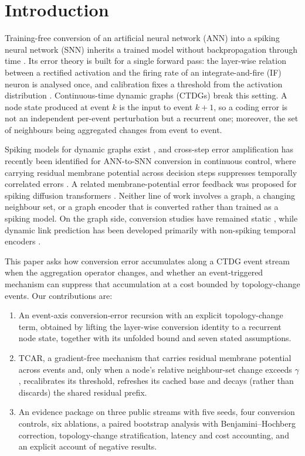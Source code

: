 \documentclass[preprint,12pt]{elsarticle}
\begin{document}
\section{Introduction}
\label{sec:intro}

Training-free conversion of an artificial neural network (ANN) into a spiking neural network (SNN) inherits a trained model without backpropagation through time \cite{rueckauer2017,diehl2015}. Its error theory is built for a single forward pass: the layer-wise relation between a rectified activation and the firing rate of an integrate-and-fire (IF) neuron is analysed once, and calibration fixes a threshold from the activation distribution \cite{li2022snncap,habara2024}. Continuous-time dynamic graphs (CTDGs) break this setting. A node state produced at event $k$ is the input to event $k+1$, so a coding error is not an independent per-event perturbation but a recurrent one; moreover, the set of neighbours being aggregated changes from event to event.

Spiking models for dynamic graphs exist \cite{li2023spikenet,yin2024dysign}, and cross-step error amplification has recently been identified for ANN-to-SNN conversion in continuous control, where carrying residual membrane potential across decision steps suppresses temporally correlated errors \cite{xu2026crpi}. A related membrane-potential error feedback was proposed for spiking diffusion transformers \cite{fang2026mpef}. Neither line of work involves a graph, a changing neighbour set, or a graph encoder that is converted rather than trained as a spiking model. On the graph side, conversion studies have remained static \cite{rueckauer2017,xia2026neuro}, while dynamic link prediction has been developed primarily with non-spiking temporal encoders \cite{rossi2020tgn,yu2023dyglib,zheng2025survey}.

This paper asks how conversion error accumulates along a CTDG event stream when the aggregation operator changes, and whether an event-triggered mechanism can suppress that accumulation at a cost bounded by topology-change events. Our contributions are:

\begin{enumerate}
\item An event-axis conversion-error recursion with an explicit topology-change term, obtained by lifting the layer-wise conversion identity to a recurrent node state, together with its unfolded bound and seven stated assumptions.
\item TCAR, a gradient-free mechanism that carries residual membrane potential across events and, only when a node's relative neighbour-set change exceeds $\gamma$, recalibrates its threshold, refreshes its cached base and decays (rather than discards) the shared residual prefix.
\item An evidence package on three public streams with five seeds, four conversion controls, six ablations, a paired bootstrap analysis with Benjamini--Hochberg correction, topology-change stratification, latency and cost accounting, and an explicit account of negative results.
\end{enumerate}
\end{document}
